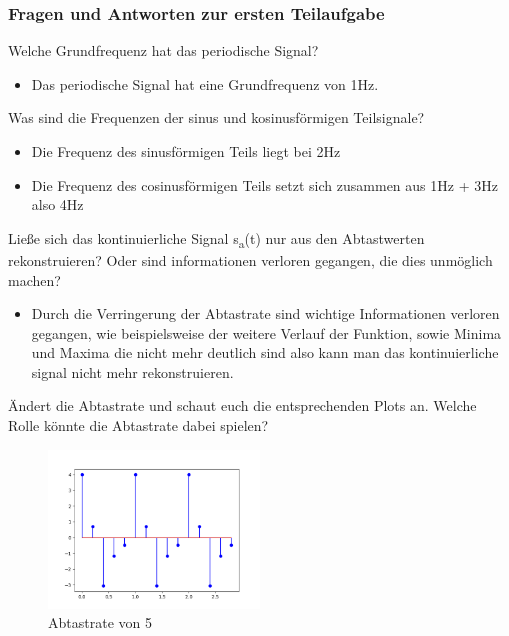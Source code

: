 \documentclass[a4paper, 11pt]{article}
\begin{document}
    \subsubsection{Fragen und Antworten zur ersten Teilaufgabe}
    Welche Grundfrequenz hat das periodische Signal? 
    \begin{itemize}
    \item Das periodische Signal hat eine Grundfrequenz von 1Hz.  
    \end{itemize}
    Was sind die Frequenzen der sinus und kosinusförmigen Teilsignale?
    \begin{itemize}
        \item Die Frequenz des sinusförmigen Teils liegt bei 2Hz
        \item Die Frequenz des cosinusförmigen Teils setzt sich zusammen aus 1Hz + 3Hz also 4Hz 
    \end{itemize}
    Ließe sich das kontinuierliche Signal s\textsubscript{a}(t) nur aus den Abtastwerten rekonstruieren? Oder sind informationen verloren gegangen, die dies unmöglich machen?
    \begin{itemize}
        \item Durch die Verringerung der Abtastrate sind wichtige Informationen verloren gegangen, wie beispielsweise der weitere Verlauf der Funktion, sowie Minima und Maxima die nicht mehr deutlich sind 
        also kann man das kontinuierliche signal nicht mehr rekonstruieren.
    \end{itemize}
    Ändert die Abtastrate und schaut euch die entsprechenden Plots an. Welche Rolle könnte die Abtastrate dabei spielen?
    \begin{figure}
        \centering
        \includegraphics[width =0.5\textwidth]{Abild220.png}
        \caption{Abtastrate von 5}
        \label{fig : label2}
        \end{figure}
    
\end{document}
